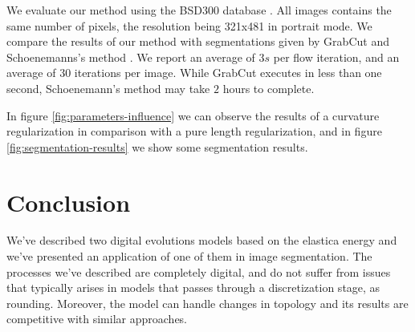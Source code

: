 \documentclass[runningheads]{llncs}
\begin{document}
We evaluate our method using the BSD300 database \cite{martinFTM01berkeley}. All images contains the same number of pixels, the resolution being 321x481 in portrait mode. We compare the results of our method with segmentations given by GrabCut and Schoenemanns's method \cite{schoenemann09linear}. We report an average of $3s$ per flow iteration, and an average of $30$ iterations per image. While GrabCut executes in less than one second, Schoenemann's method may take $2$ hours to complete.


In figure \ref{fig:parameters-influence} we can observe the results of a curvature regularization in comparison with a pure length regularization, and in figure \ref{fig:segmentation-results} we show some segmentation results.



\section{Conclusion}\label{sec:conclusion}


We've described two digital evolutions models based on the elastica energy and we've presented an application of one of them in image segmentation. The processes we've described are completely digital, and do not suffer from issues that typically arises in models that passes through a discretization stage, as rounding. Moreover, the model can handle changes in topology and its results are competitive with similar approaches. 



%
%
%


\end{document}
